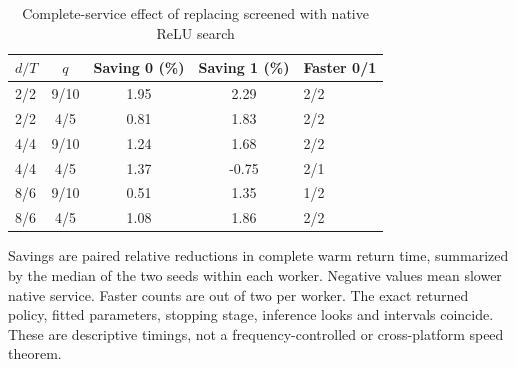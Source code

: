 \begin{table}[htbp]
\centering
\caption{Complete-service effect of replacing screened with native ReLU search}\label{tab:matched61}
{\small\setlength{\tabcolsep}{3pt}
\begin{tabular}{lcccl}
\hline
$d/T$ & $q$ & Saving 0 (\%) & Saving 1 (\%) & Faster 0/1 \\
\hline
2/2 & 9/10 & 1.95 & 2.29 & 2/2 \\
2/2 & 4/5 & 0.81 & 1.83 & 2/2 \\
4/4 & 9/10 & 1.24 & 1.68 & 2/2 \\
4/4 & 4/5 & 1.37 & -0.75 & 2/1 \\
8/6 & 9/10 & 0.51 & 1.35 & 1/2 \\
8/6 & 4/5 & 1.08 & 1.86 & 2/2 \\
\hline\end{tabular}}
\par\smallskip
{\footnotesize Savings are paired relative reductions in complete warm return time, summarized by the median of the two seeds within each worker. Negative values mean slower native service. Faster counts are out of two per worker. The exact returned policy, fitted parameters, stopping stage, inference looks and intervals coincide. These are descriptive timings, not a frequency-controlled or cross-platform speed theorem.}
\end{table}
